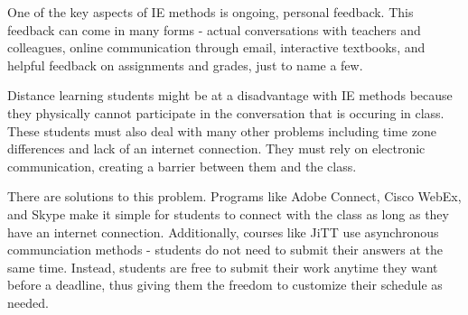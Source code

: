 One of the key aspects of IE methods is ongoing, personal feedback. This feedback can come in many forms - actual conversations with teachers and colleagues, online communication through email, interactive textbooks, and helpful feedback on assignments and grades, just to name a few.

Distance learning students might be at a disadvantage with IE methods because they physically cannot participate in the conversation that is occuring in class. These students must also deal with many other problems including time zone differences and lack of an internet connection. They must rely on electronic communication, creating a barrier between them and the class.

There are solutions to this problem. Programs like Adobe Connect, Cisco WebEx, and Skype make it simple for students to connect with the class as long as they have an internet connection. Additionally, courses like JiTT use asynchronous communciation methods - students do not need to submit their answers at the same time. Instead, students are free to submit their work anytime they want before a deadline, thus giving them the freedom to customize their schedule as needed.


